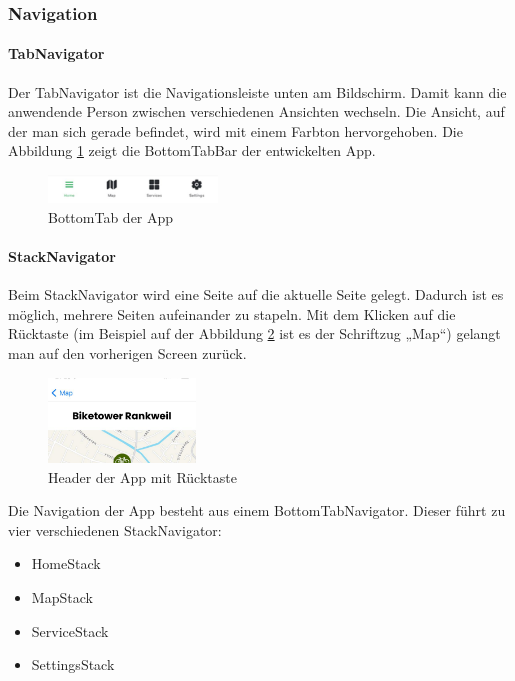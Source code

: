 \subsubsection{Navigation}
\paragraph{TabNavigator} Der \Gls{TabNavigator} ist die Navigationsleiste unten am Bildschirm. Damit kann die anwendende Person zwischen verschiedenen Ansichten wechseln. Die Ansicht, auf der man sich gerade befindet, wird mit einem Farbton hervorgehoben. Die Abbildung \ref{fig:bottomtab} zeigt die \Gls{BottomTabBar} der entwickelten App. 

\begin{figure}[H]
    \centering
    \includegraphics[width=0.4\textwidth]{images/tab.png}
    \caption{BottomTab der App}
    \label{fig:bottomtab}
\end{figure}

\paragraph{StackNavigator}Beim \Gls{StackNavigator} wird eine Seite auf die aktuelle Seite gelegt. Dadurch ist es möglich, mehrere Seiten aufeinander zu stapeln. Mit dem Klicken auf die Rücktaste (im Beispiel auf der Abbildung \ref{fig:appheader} ist es der Schriftzug „Map“) gelangt man auf den vorherigen Screen zurück. 

\begin{figure}[H]
    \centering
    \includegraphics[width=0.35\textwidth]{images/appheader.png}
    \caption{Header der App mit Rücktaste}
    \label{fig:appheader}
\end{figure}

\clearpage
\noindent Die Navigation der App besteht aus einem Bottom\Gls{TabNavigator}. Dieser führt zu vier verschiedenen \Gls{StackNavigator}:

\begin{itemize}
    \item HomeStack
    \item MapStack
    \item ServiceStack
    \item SettingsStack
\end{itemize}

